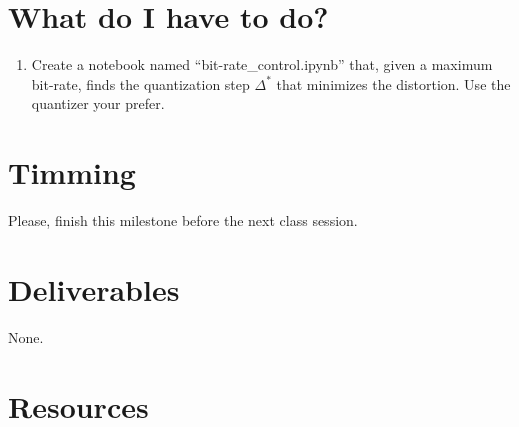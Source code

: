 
\section{What do I have to do?}

\begin{enumerate}
\item Create a notebook named ``bit-rate\_control.ipynb'' that, given
  a maximum bit-rate, finds the quantization step $\Delta^*$ that
  minimizes the distortion. Use the quantizer your prefer.
\end{enumerate}


\section{Timming}

Please, finish this milestone before the next class session.

\section{Deliverables}

None.

\section{Resources}

\renewcommand{\addcontentsline}[3]{} %

